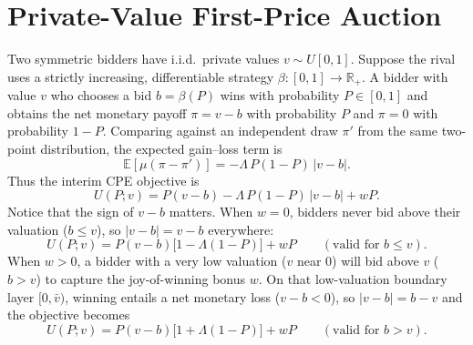 \documentclass[11pt,a4paper]{article}
\theoremstyle{remark}
\begin{document}
\section{Private-Value First-Price Auction}
\label{sec:pv}
Two symmetric bidders have i.i.d.\ private values $v\sim U[0,1]$. Suppose the rival
uses a strictly increasing, differentiable strategy $\beta:[0,1]\to\mathbb{R}_+$. A
bidder with value $v$ who chooses a bid $b=\beta(P)$ wins with probability $P\in[0,1]$
and obtains the net monetary payoff $\pi=v-b$ with probability $P$ and $\pi=0$ with
probability $1-P$. Comparing against an independent draw $\pi'$ from the same
two-point distribution, the expected gain--loss term is
\begin{equation}
\mathbb{E}[\mu(\pi-\pi')]=-\Lambda\,P(1-P)\,|v-b|.
\end{equation}
Thus the interim CPE objective is
\begin{equation}
U(P;v)=P(v-b)-\Lambda\,P(1-P)\,|v-b|+wP .
\label{eq:pvobj_gen}
\end{equation}
Notice that the sign of $v-b$ matters. When $w=0$, bidders never bid above their
valuation ($b\le v$), so $|v-b|=v-b$ everywhere:
\begin{equation}
U(P;v)=P(v-b)\big[1-\Lambda(1-P)\big]+wP \qquad (\text{valid for } b\le v).
\label{eq:pvobj}
\end{equation}
When $w>0$, a bidder with a very low valuation ($v$ near $0$) will bid above $v$
($b>v$) to capture the joy-of-winning bonus $w$. On that low-valuation boundary
layer $[0,\bar v)$, winning entails a net monetary loss ($v-b<0$), so $|v-b|=b-v$
and the objective becomes
\begin{equation}
U(P;v)=P(v-b)\big[1+\Lambda(1-P)\big]+wP \qquad (\text{valid for } b>v).
\label{eq:pvobj_loss}
\end{equation}
\end{document}
